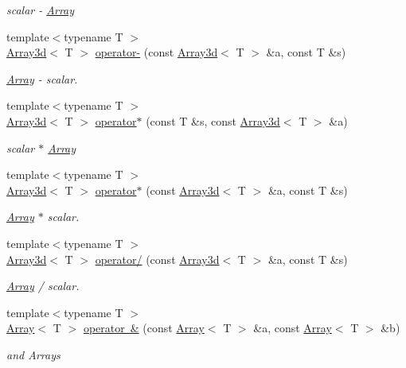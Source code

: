 \begin{DoxyCompactItemize}
\begin{DoxyCompactList}\small\item\em scalar -\/ \mbox{\hyperlink{classXMLArray_1_1Array}{Array}} \end{DoxyCompactList}\item 
{\footnotesize template$<$typename T $>$ }\\\mbox{\hyperlink{classXMLArray_1_1Array3d}{Array3d}}$<$ T $>$ \mbox{\hyperlink{namespaceXMLArray_a87b6f705aa4d225a13f5d6857be44459}{operator-\/}} (const \mbox{\hyperlink{classXMLArray_1_1Array3d}{Array3d}}$<$ T $>$ \&a, const T \&s)
\begin{DoxyCompactList}\small\item\em \mbox{\hyperlink{classXMLArray_1_1Array}{Array}} -\/ scalar. \end{DoxyCompactList}\item 
{\footnotesize template$<$typename T $>$ }\\\mbox{\hyperlink{classXMLArray_1_1Array3d}{Array3d}}$<$ T $>$ \mbox{\hyperlink{namespaceXMLArray_a09c6c9bdce753a6c7ccd4efbdda02e23}{operator$\ast$}} (const T \&s, const \mbox{\hyperlink{classXMLArray_1_1Array3d}{Array3d}}$<$ T $>$ \&a)
\begin{DoxyCompactList}\small\item\em scalar $\ast$ \mbox{\hyperlink{classXMLArray_1_1Array}{Array}} \end{DoxyCompactList}\item 
{\footnotesize template$<$typename T $>$ }\\\mbox{\hyperlink{classXMLArray_1_1Array3d}{Array3d}}$<$ T $>$ \mbox{\hyperlink{namespaceXMLArray_a6e9dd6864853158f18b5f406e398c570}{operator$\ast$}} (const \mbox{\hyperlink{classXMLArray_1_1Array3d}{Array3d}}$<$ T $>$ \&a, const T \&s)
\begin{DoxyCompactList}\small\item\em \mbox{\hyperlink{classXMLArray_1_1Array}{Array}} $\ast$ scalar. \end{DoxyCompactList}\item 
{\footnotesize template$<$typename T $>$ }\\\mbox{\hyperlink{classXMLArray_1_1Array3d}{Array3d}}$<$ T $>$ \mbox{\hyperlink{namespaceXMLArray_af90bb7d526be91f27f5ae1bdf5bd5a44}{operator/}} (const \mbox{\hyperlink{classXMLArray_1_1Array3d}{Array3d}}$<$ T $>$ \&a, const T \&s)
\begin{DoxyCompactList}\small\item\em \mbox{\hyperlink{classXMLArray_1_1Array}{Array}} / scalar. \end{DoxyCompactList}\item 
{\footnotesize template$<$typename T $>$ }\\\mbox{\hyperlink{classXMLArray_1_1Array}{Array}}$<$ T $>$ \mbox{\hyperlink{namespaceXMLArray_a4e97a656e19bfbb4c5574c3a60b2ed93}{operator \&}} (const \mbox{\hyperlink{classXMLArray_1_1Array}{Array}}$<$ T $>$ \&a, const \mbox{\hyperlink{classXMLArray_1_1Array}{Array}}$<$ T $>$ \&b)
\begin{DoxyCompactList}\small\item\em and Arrays \end{DoxyCompactList}\end{DoxyCompactItemize}


